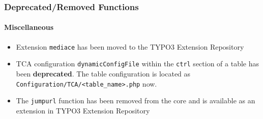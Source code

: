 \begin{frame}[fragile]
	\frametitle{Deprecated/Removed Functions}
	\framesubtitle{Miscellaneous}

	\begin{itemize}

		\item Extension \texttt{mediace} has been moved to the TYPO3 Extension Repository

		\item TCA configuration \texttt{dynamicConfigFile} within the \texttt{ctrl} section of a
			table has been \textbf{deprecated}.
			The table configuration is located as \texttt{Configuration/TCA/<table\_name>.php} now.

		\item The \texttt{jumpurl} function has been removed from the core and is available
			as an extension in TYPO3 Extension Repository

	\end{itemize}

\end{frame}

